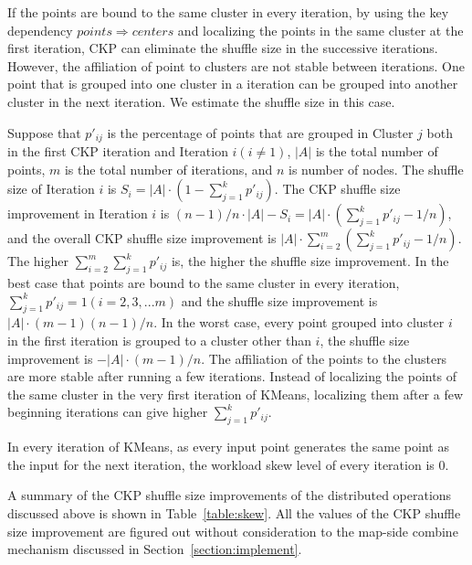 \documentclass[10pt,journal,compsoc]{IEEEtran}
\begin{document}
If the points are bound to the same cluster in every iteration, 
by using the key dependency $points \Rightarrow centers$ 
and localizing the points in the same cluster at the first iteration, 
CKP can eliminate the shuffle size in the successive iterations. 
However, the affiliation of point to clusters are not stable between iterations. 
One point that is grouped into one cluster in a iteration can be grouped into another cluster in the next iteration. 
We estimate the shuffle size in this case. 

Suppose that $p'_{ij}$ is the percentage of points that are grouped in Cluster $j$ both in the first CKP iteration and Iteration $i (i \neq 1)$, 
$|A|$ is the total number of points, $m$ is the total number of iterations, 
and $n$ is number of nodes. 
The shuffle size of Iteration $i$ is $S_i=|A| \cdot (1-\sum_{j=1}^{k} p'_{ij})$.
The CKP shuffle size improvement in Iteration $i$ is 
$(n-1)/n \cdot |A| - S_i = |A| \cdot (\sum_{j=1}^{k} p'_{ij} - 1/n)$, 
and the overall CKP shuffle size improvement is $|A| \cdot \sum_{i=2}^{m} (\sum_{j=1}^{k} p'_{ij} - 1/n)$.
The higher $\sum_{i=2}^{m} \sum_{j=1}^{k} p'_{ij}$ is, the higher the shuffle size improvement. 
In the best case that points are bound to the same cluster in every iteration, 
$\sum_{j=1}^{k} p'_{ij}=1 (i=2,3,...m)$ 
and the shuffle size improvement is $|A| \cdot (m-1)(n-1)/n$.
In the worst case, every point grouped into cluster $i$ in the first iteration is grouped to a cluster other than $i$, the shuffle size improvement is 
$-|A|\cdot (m-1)/n$. 
The affiliation of the points to the clusters are more stable after running a few iterations. 
Instead of localizing the points of the same cluster in the very first iteration of KMeans, localizing them after a few beginning iterations can give higher $\sum_{j=1}^{k} p'_{ij}$.

In every iteration of KMeans, as every input point generates the same point as the input for the next iteration, the workload skew level of every iteration is 0. 


A summary of the CKP shuffle size improvements of the distributed operations discussed above is shown in Table~\ref{table:skew}.
All the values of the CKP shuffle size improvement are figured out without consideration to the map-side combine mechanism discussed in Section~\ref{section:implement}.
\end{document}
